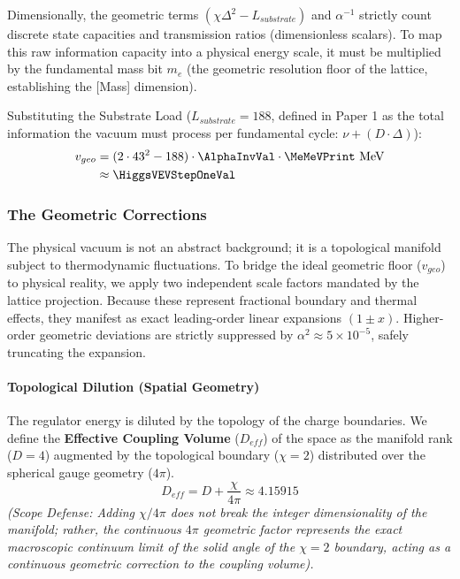 Dimensionally, the geometric terms $(\chi \Delta^2 - L_{substrate})$ and $\alpha^{-1}$ strictly count discrete state capacities and transmission ratios (dimensionless scalars). To map this raw information capacity into a physical energy scale, it must be multiplied by the fundamental mass bit $m_e$ (the geometric resolution floor of the lattice, establishing the [Mass] dimension).

Substituting the Substrate Load ($L_{substrate} = 188$, defined in Paper 1 \cite{meyer_informational_2026} as the total information the vacuum must process per fundamental cycle: $\nu + (D \cdot \Delta)$):
\begin{equation}
\begin{split}
v_{geo} &= (2 \cdot 43^2 - 188) \cdot \AlphaInvVal \cdot \MeMeVPrint \text{ MeV} \\
&\approx \HiggsVEVStepOneVal
\end{split}
\end{equation}

\subsubsection{The Geometric Corrections}
The physical vacuum is not an abstract background; it is a topological manifold subject to thermodynamic fluctuations. To bridge the ideal geometric floor ($v_{geo}$) to physical reality, we apply two independent scale factors mandated by the lattice projection. Because these represent fractional boundary and thermal effects, they manifest as exact leading-order linear expansions $(1 \pm x)$. Higher-order geometric deviations are strictly suppressed by $\alpha^2 \approx 5 \times 10^{-5}$, safely truncating the expansion.

\paragraph{Topological Dilution (Spatial Geometry)}
The regulator energy is diluted by the topology of the charge boundaries. We define the \textbf{Effective Coupling Volume} ($D_{eff}$) of the space as the manifold rank ($D=4$) augmented by the topological boundary ($\chi=2$) distributed over the spherical gauge geometry ($4\pi$).
\begin{equation}
D_{eff} = D + \frac{\chi}{4\pi} \approx 4.15915
\end{equation}
\textit{(Scope Defense: Adding $\chi/4\pi$ does not break the integer dimensionality of the manifold; rather, the continuous $4\pi$ geometric factor represents the exact macroscopic continuum limit of the solid angle of the $\chi=2$ boundary, acting as a continuous geometric correction to the coupling volume).}

